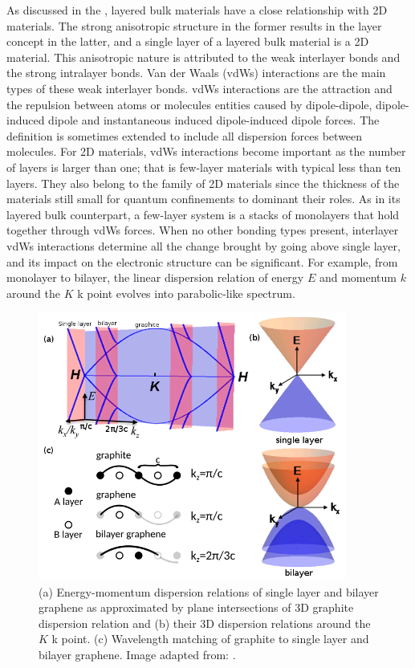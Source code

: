 As discussed in the , layered bulk materials have a close relationship with 2D materials. The strong anisotropic structure in the former results in the layer concept in the latter, and a single layer of a layered bulk material is a 2D material. This anisotropic nature is attributed to the weak interlayer bonds and the strong intralayer bonds. Van der Waals (vdWs) interactions \cite{vdws} are the main types of these weak interlayer bonds. vdWs interactions are the attraction and the repulsion between atoms or molecules entities caused by dipole-dipole, dipole-induced dipole and instantaneous induced dipole-induced dipole forces. The definition is sometimes extended to include all dispersion forces between molecules.  For 2D materials, vdWs interactions become important as the number of layers is larger than one; that is few-layer materials with typical less than ten layers. They also belong to the family of 2D materials since the thickness of the materials still small for quantum confinements to dominant their roles. As in its layered bulk counterpart, a few-layer system is a stacks of monolayers that hold together through vdWs forces. When no other bonding types present, interlayer vdWs interactions determine all the change brought by going above single layer, and its impact on the electronic structure can be significant. For example, from monolayer to bilayer, the linear dispersion relation of energy $E$ and momentum $k$ around the $K$ k point evolves into parabolic-like spectrum\cite{Partoens2006,Mak2010}. 

\begin{figure}[htbp!] 
\centering  
\includegraphics[width=0.9\textwidth]{gra_band.png}
\caption{(a) Energy-momentum dispersion relations of single layer and bilayer graphene as approximated by plane intersections of 3D graphite dispersion relation and (b) their 3D dispersion relations around the $K$ k point. (c) Wavelength matching of graphite to single layer and bilayer graphene. Image adapted from: \cite{Mak2010}. }  
\label{fig:gra_bands}
\end{figure} 

